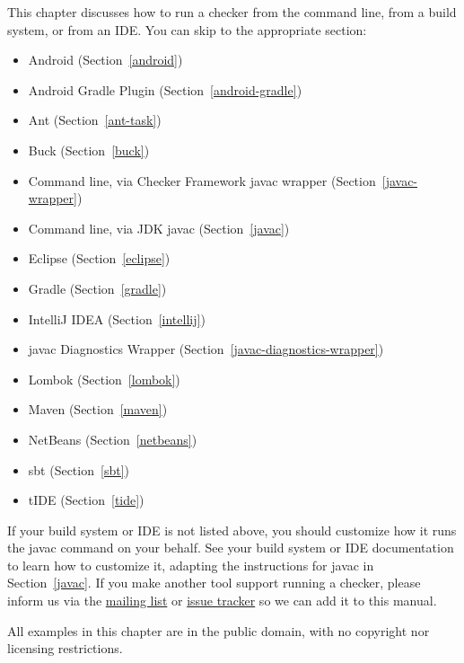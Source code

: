 \htmlhr
{}

This chapter discusses how to run a checker from the command line, from a
build system, or from an IDE\@.  You can skip to the appropriate section:

\begin{itemize}
\item Android (Section~\ref{android})
\item Android Gradle Plugin (Section~\ref{android-gradle})
\item Ant (Section~\ref{ant-task})
\item Buck (Section~\ref{buck})
\item Command line, via Checker Framework javac wrapper (Section~\ref{javac-wrapper})
\item Command line, via JDK javac (Section~\ref{javac})
\item Eclipse (Section~\ref{eclipse})
\item Gradle (Section~\ref{gradle})
\item IntelliJ IDEA (Section~\ref{intellij})
\item javac Diagnostics Wrapper (Section~\ref{javac-diagnostics-wrapper})
\item Lombok (Section~\ref{lombok})
\item Maven (Section~\ref{maven})
\item NetBeans (Section~\ref{netbeans})
\item sbt (Section~\ref{sbt})
\item tIDE (Section~\ref{tide})
\end{itemize}

If your build system or IDE is not listed above, you should customize how
it runs the javac command on your behalf.  See your build system or IDE
documentation to learn how to
customize it, adapting the instructions for javac in Section~\ref{javac}.
If you make another tool support running a checker, please
inform us via the
\href{https://groups.google.com/forum/#!forum/checker-framework-discuss}{mailing
  list} or
\href{https://github.com/typetools/checker-framework/issues}{issue tracker} so
we can add it to this manual.

All examples in this chapter are in the public domain, with no copyright nor
licensing restrictions.



